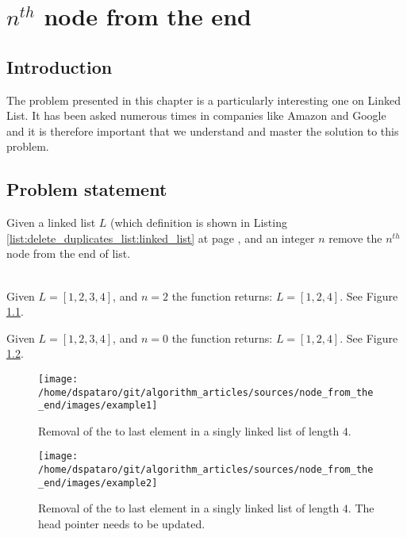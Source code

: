%

\chapter{$n^{th}$ node from the end}
\label{ch:node_from_the_end}
\section*{Introduction}
The problem presented in this chapter is a particularly interesting one on Linked List. It has been asked numerous times in companies like Amazon and Google and it is therefore important that we understand and master the solution to this problem.

\section{Problem statement}
\begin{exercise}
Given a linked list $L$ (which definition is shown in Listing \ref{list:delete_duplicates_list:linked_list} at page \pageref{list:delete_duplicates_list:linked_list} , and an integer $n$ remove the $n^{th}$ node from the end of list.

\begin{example}
	\hfill \\
	Given $L=[1,2,3,4]$, and $n=2$ the function returns: $L=[1,2,4]$. See Figure \ref{fig:node_from_the_end:example1}.
\end{example}

\begin{example}
	Given $L=[1,2,3,4]$, and $n=0$ the function returns: $L=[1,2,4]$.
	See Figure \ref{fig:node_from_the_end:example2}.
\end{example}
\end{exercise}


\begin{figure}
	\label{fig:node_from_the_end:example1}
	\centering
	\texttt{[image: /home/dspataro/git/algorithm\_articles/sources/node\_from\_the\_end/images/example1]}
	\caption{Removal of the  to last element in a singly linked list of length $4$.}
\end{figure}

\begin{figure}
	\label{fig:node_from_the_end:example2}
	\centering
	\texttt{[image: /home/dspataro/git/algorithm\_articles/sources/node\_from\_the\_end/images/example2]}
	\caption{Removal of the  to last element in a singly linked list of length $4$. The head pointer needs to be updated.}
\end{figure}


